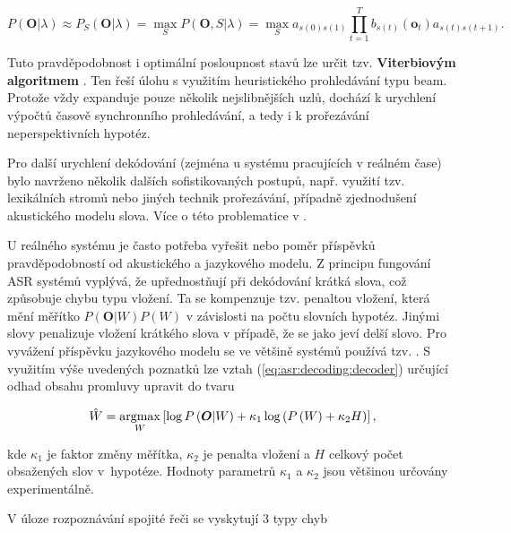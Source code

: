 \begin{equation}
  P\left(\boldsymbol{O}|\lambda\right) \approx P_S\left(\boldsymbol{O}|\lambda\right) = \max_S P\left(\boldsymbol{O}, S| \lambda \right) = \max_S a_{s\left(0\right)s\left(1\right)} \prod_{t=1}^{T} b_{s\left(t\right)}\left(\boldsymbol{o}_t\right) a_{s\left(t\right)s\left(t+1\right)}.
  \label{eq:asr:decoding:approx}
\end{equation}

\noindent Tuto pravděpodobnost i optimální posloupnost stavů lze určit tzv. \textbf{Viterbiovým algoritmem} \cite{Holmes2001}. Ten řeší úlohu s využitím heuristického prohledávání typu beam. Protože vždy expanduje pouze několik nejslibnějších uzlů, dochází k urychlení výpočtů časově synchronního prohledávání, a tedy i k prořezávání neperspektivních hypotéz.

Pro další urychlení dekódování (zejména u systému pracujících v reálném čase) bylo navrženo několik dalších sofistikovaných postupů, např. využití tzv. lexikálních stromů nebo jiných technik prořezávání, případně zjednodušení akustického modelu slova. Více o této problematice v \cite{Psutka2006}.

U reálného systému je často potřeba vyřešit nebo  poměr příspěvků pravděpodobností od akustického a jazykového modelu. Z principu fungování ASR systémů vyplývá, že upřednostňují při dekódování krátká slova, což způsobuje chybu typu vložení. Ta se kompenzuje tzv. penaltou vložení, která mění měřítko $P(\boldsymbol{O}|W)P(W)$ v závislosti na počtu slovních hypotéz. Jinými slovy penalizuje vložení krátkého slova v případě, že se jako  jeví delší slovo. Pro vyvážení příspěvku jazykového modelu se ve většině systémů používá tzv. . S využitím výše uvedených poznatků lze vztah (\ref{eq:asr:decoding:decoder}) určující odhad obsahu promluvy upravit do tvaru

\begin{equation}
  \hat{W} = \operatorname*{argmax}_{W} \left[\log P\left(\boldsymbol{O}|W\right) + \kappa_1 \log\left(P\left(W\right) + \kappa_2H\right)\right],
  \label{eq:asr:decoding:compensated}
\end{equation}

\noindent kde $\kappa_1$ je faktor změny měřítka, $\kappa_2$ je penalta vložení a $H$ celkový počet obsažených slov v~hypotéze. Hodnoty parametrů $\kappa_1$ a $\kappa_2$ jsou většinou určovány experimentálně.

V úloze rozpoznávání spojité řeči se vyskytují 3 typy chyb

